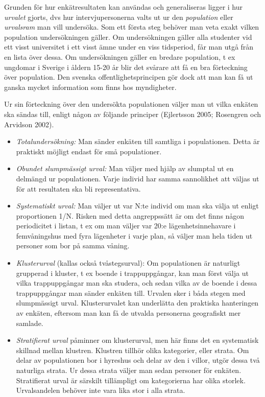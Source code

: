 Grunden för hur enkätresultaten kan användas och generaliseras ligger i
hur \emph{urvalet} gjorts, dvs hur intervjupersonerna valts ut ur den
\emph{population} eller \emph{urvalsram} man vill undersöka. Som ett
första steg behöver man veta exakt vilken population undersökningen
gäller. Om undersökningen gäller alla studenter vid ett visst
universitet i ett visst ämne under en viss tidsperiod, får man utgå från
en lista över dessa. Om undersökningen gäller en bredare population, t
ex ungdomar i Sverige i åldern 15-20 år blir det svårare att få en bra
förteckning över population. Den svenska offentlighetsprincipen gör dock
att man kan få ut ganska mycket information som finns hos myndigheter.

Ur sin förteckning över den undersökta populationen väljer man ut vilka
enkäten ska sändas till, enligt någon av följande principer (Ejlertsson
2005; Rosengren och Arvidson 2002).

\begin{itemize}
\item
  \emph{Totalundersökning:} Man sänder enkäten till samtliga i
  populationen. Detta är praktiskt möjligt endast för små populationer.
\item
  \emph{Obundet slumpmässigt urval:} Man väljer med hjälp av slumptal ut
  en delmängd ur populationen. Varje individ har samma sannolikhet att
  väljas ut för att resultaten ska bli representativa.
\item
  \emph{Systematiskt urval:} Man väljer ut var N:te individ om man ska
  välja ut enligt proportionen 1/N. Risken med detta angreppssätt är om
  det finns någon periodicitet i listan, t ex om man väljer var 20:e
  lägenhetsinnehavare i femvåningshus med fyra lägenheter i varje plan,
  så väljer man hela tiden ut personer som bor på samma våning.
\item
  \emph{Klusterurval} (kallas också tvåstegsurval): Om populationen är
  naturligt grupperad i kluster, t ex boende i trappuppgångar, kan man
  först välja ut vilka trappuppgångar man ska studera, och sedan vilka
  av de boende i dessa trappuppgångar man sänder enkäten till. Urvalen
  sker i båda stegen med slumpmässigt urval. Klusterurvalet kan
  underlätta den praktiska hanteringen av enkäten, eftersom man kan få
  de utvalda personerna geografiskt mer samlade.
\item
  \emph{Stratifierat urval} påminner om klusterurval, men här finns det
  en systematisk skillnad mellan klustren. Klustren tillhör olika
  kategorier, eller strata. Om delar av populationen bor i hyreshus och
  delar av den i villor, utgör dessa två naturliga strata. Ur dessa
  strata väljer man sedan personer för enkäten. Stratifierat urval är
  särskilt tillämpligt om kategorierna har olika storlek. Urvalsandelen
  behöver inte vara lika stor i alla strata.
\end{itemize}

